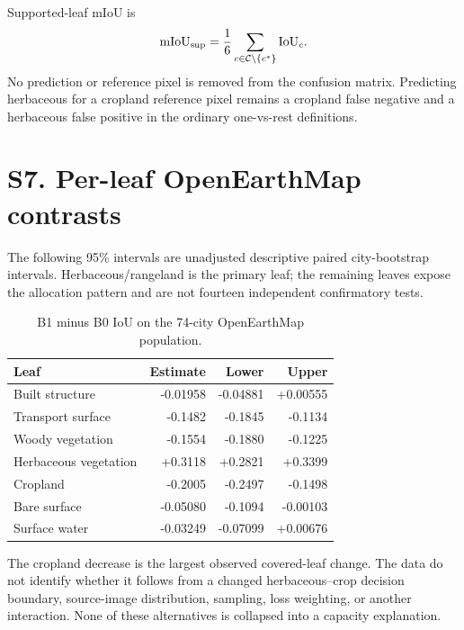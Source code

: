 Supported-leaf mIoU is
\[
\mathrm{mIoU}_{\mathrm{sup}}=\frac{1}{6}\sum_{c\in\mathcal{C}\setminus\{c^*\}}\mathrm{IoU}_c.
\]
No prediction or reference pixel is removed from the confusion matrix. Predicting herbaceous for a cropland reference pixel remains a cropland false negative and a herbaceous false positive in the ordinary one-vs-rest definitions.

\section*{S7. Per-leaf OpenEarthMap contrasts}
The following 95\% intervals are unadjusted descriptive paired city-bootstrap intervals. Herbaceous/rangeland is the primary leaf; the remaining leaves expose the allocation pattern and are not fourteen independent confirmatory tests.
\begin{table}[H]
\centering
\caption{B1 minus B0 IoU on the 74-city OpenEarthMap population.}
\begin{tabular}{lrrr}
\toprule
Leaf & Estimate & Lower & Upper \\
\midrule
Built structure & -0.01958 & -0.04881 & +0.00555 \\
Transport surface & -0.1482 & -0.1845 & -0.1134 \\
Woody vegetation & -0.1554 & -0.1880 & -0.1225 \\
Herbaceous vegetation & +0.3118 & +0.2821 & +0.3399 \\
Cropland & -0.2005 & -0.2497 & -0.1498 \\
Bare surface & -0.05080 & -0.1094 & -0.00103 \\
Surface water & -0.03249 & -0.07099 & +0.00676 \\
\bottomrule
\end{tabular}
\end{table}
The cropland decrease is the largest observed covered-leaf change. The data do not identify whether it follows from a changed herbaceous--crop decision boundary, source-image distribution, sampling, loss weighting, or another interaction. None of these alternatives is collapsed into a capacity explanation.

